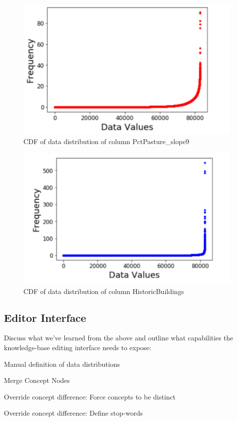 \begin{figure}[H]
	\centering
	\includegraphics[width=0.8\columnwidth]{graphics/Challenge7_1}
	\caption{CDF of data distribution of column PctPasture\_slope9}
	\label{fig:Distribution 3}
\end{figure}

\begin{figure}[H]
	\centering
	\includegraphics[width=0.8\columnwidth]{graphics/Challenge7_2}
	\caption{CDF of data distribution of column HistoricBuildings}
	\label{fig:Distribution 4}
\end{figure}


\subsection{Editor Interface}
Discuss what we've learned from the above and outline what capabilities the knowledge-base editing interface needs to expose:
\begin{enumerate*}
	\item Manual definition of data distributions
	\item Merge Concept Nodes
	\item Override concept difference: Force concepts to be distinct
	\item Override concept difference: Define stop-words
\end{enumerate*}

